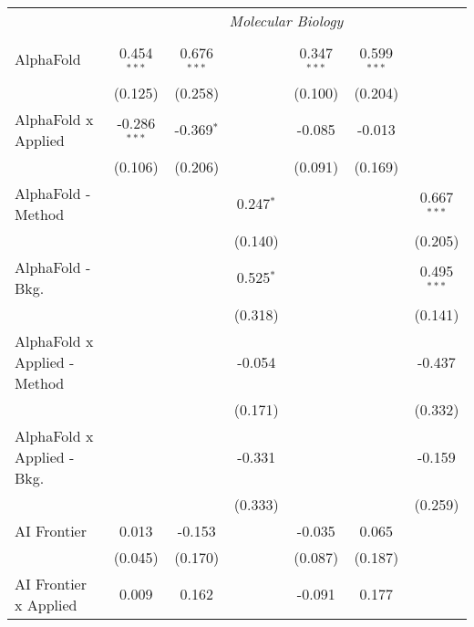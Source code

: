 \begin{tabular}{lcccccc}
 & \multicolumn{6}{c}{\textit{Molecular Biology}} \\ \\
   AlphaFold                      & 0.454$^{***}$  & 0.676$^{***}$ &             & 0.347$^{***}$ & 0.599$^{***}$ &   \\   
                                  & (0.125)        & (0.258)       &             & (0.100)       & (0.204)       &   \\   
   AlphaFold x Applied            & -0.286$^{***}$ & -0.369$^{*}$  &             & -0.085        & -0.013        &   \\   
                                  & (0.106)        & (0.206)       &             & (0.091)       & (0.169)       &   \\   
   AlphaFold - Method             &                &               & 0.247$^{*}$ &               &               & 0.667$^{***}$\\   
                                  &                &               & (0.140)     &               &               & (0.205)\\   
   AlphaFold - Bkg.               &                &               & 0.525$^{*}$ &               &               & 0.495$^{***}$\\   
                                  &                &               & (0.318)     &               &               & (0.141)\\   
   AlphaFold x Applied - Method   &                &               & -0.054      &               &               & -0.437\\   
                                  &                &               & (0.171)     &               &               & (0.332)\\   
   AlphaFold x Applied - Bkg.     &                &               & -0.331      &               &               & -0.159\\   
                                  &                &               & (0.333)     &               &               & (0.259)\\   
   AI Frontier                    & 0.013          & -0.153        &             & -0.035        & 0.065         &   \\   
                                  & (0.045)        & (0.170)       &             & (0.087)       & (0.187)       &   \\   
   AI Frontier x Applied          & 0.009          & 0.162         &             & -0.091        & 0.177         &   \\   

\end{tabular}
